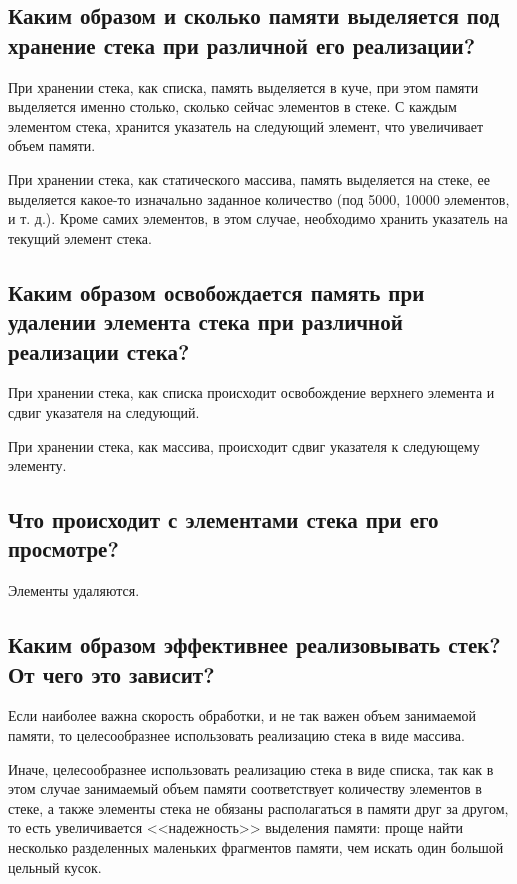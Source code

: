 \documentclass[a4paper,12pt]{extarticle}
\begin{document}
\subsection{Каким образом и сколько памяти выделяется под хранение стека при различной его реализации?}

При хранении стека, как списка, память выделяется в куче, при этом памяти выделяется именно столько, сколько сейчас элементов в стеке. С каждым элементом стека, хранится указатель на следующий элемент, что увеличивает объем памяти.

При хранении стека, как статического массива, память выделяется на стеке, ее выделяется какое-то изначально заданное количество (под 5000, 10000 элементов, и т. д.). Кроме самих элементов, в этом случае, необходимо хранить указатель на текущий элемент стека.

\subsection{Каким образом освобождается память при удалении элемента стека при различной реализации стека?}

При хранении стека, как списка происходит освобождение верхнего элемента и сдвиг указателя на следующий.

При хранении стека, как массива, происходит сдвиг указателя к следующему элементу.

\subsection{Что происходит с элементами стека при его просмотре?}

Элементы удаляются.

\subsection{Каким образом эффективнее реализовывать стек? От чего это зависит?}

Если наиболее важна скорость обработки, и не так важен объем занимаемой памяти, то целесообразнее использовать реализацию стека в виде массива. 

Иначе, целесообразнее использовать реализацию стека в виде списка, так как в этом случае занимаемый объем памяти соответствует количеству элементов в стеке, а также элементы стека не обязаны располагаться в памяти друг за другом, то есть увеличивается <<надежность>> выделения памяти: проще найти несколько разделенных маленьких фрагментов памяти, чем искать один большой цельный кусок.
\end{document}
